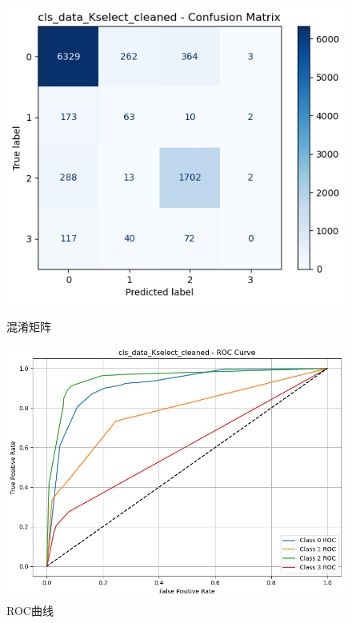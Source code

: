 \documentclass[10pt]{article}
\begin{document}
\begin{figure}[H]
\centering
\begin{minipage}[t]{0.45\textwidth}
  \centering
  \includegraphics[width=\linewidth]{cls_knn_10sc.png}
  \caption{混淆矩阵}
  \label{fig:30}
\end{minipage}
\hfill
\begin{minipage}[t]{0.52\textwidth}
  \centering
  \includegraphics[width=\linewidth]{cls_knn_10sc2.png}
  \caption{ROC曲线}
  \label{fig:31}
\end{minipage}
\end{figure}
\end{document}
